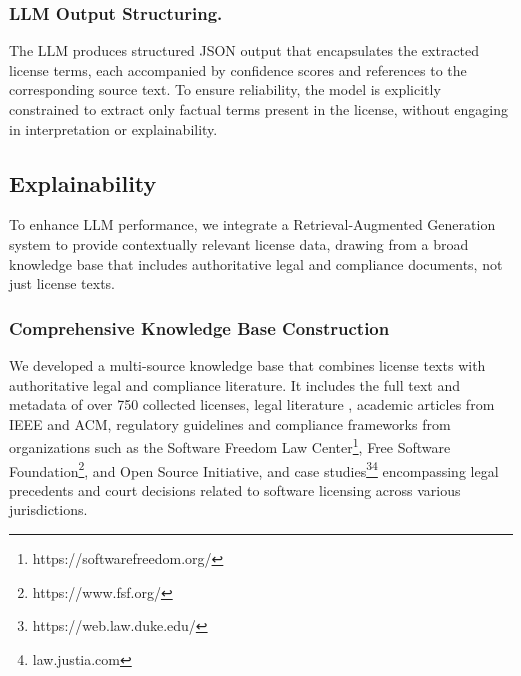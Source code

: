 \subsubsection{LLM Output Structuring.}

The LLM produces structured JSON output that encapsulates the extracted license terms, each accompanied by confidence scores and references to the corresponding source text. To ensure reliability, the model is explicitly constrained to extract only factual terms present in the license, without engaging in interpretation or explainability.\\










\subsection{Explainability}
\label{sec:Explainability}

To enhance LLM performance, we integrate a Retrieval-Augmented Generation system to provide contextually relevant license data, drawing from a broad knowledge base that includes authoritative legal and compliance documents, not just license texts.

\subsubsection{Comprehensive Knowledge Base Construction}

We developed a multi-source knowledge base that combines license texts with authoritative legal and compliance literature. It includes the full text and metadata of over 750 collected licenses, legal literature \cite{Haddad2018OpenSource,meeker2020open,2022open}, academic articles from IEEE and ACM, regulatory guidelines and compliance frameworks from organizations such as the Software Freedom Law Center\footnote{https://softwarefreedom.org/}, Free Software Foundation\footnote{https://www.fsf.org/}, and Open Source Initiative, and case studies\footnote{https://web.law.duke.edu/}\footnote{law.justia.com} encompassing legal precedents and court decisions related to software licensing across various jurisdictions.


